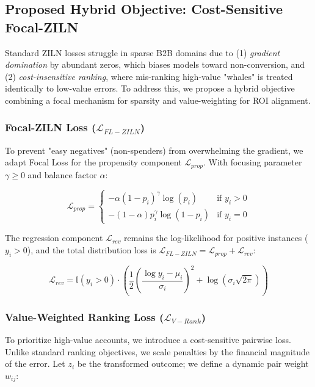 \documentclass[runningheads]{llncs}
\begin{document}
\subsection{Proposed Hybrid Objective: Cost-Sensitive Focal-ZILN}
Standard ZILN losses \cite{rerum2024}\cite{wang2019deep} struggle in sparse B2B domains due to (1) \textit{gradient domination} by abundant zeros, which biases models toward non-conversion, and (2) \textit{cost-insensitive ranking}, where mis-ranking high-value "whales" is treated identically to low-value errors. To address this, we propose a hybrid objective combining a focal mechanism for sparsity and value-weighting for ROI alignment.

\subsubsection{Focal-ZILN Loss ($\mathcal{L}_{FL-ZILN}$)}
To prevent "easy negatives" (non-spenders) from overwhelming the gradient, we adapt Focal Loss for the propensity component $\mathcal{L}_{prop}$. With focusing parameter $\gamma \ge 0$ and balance factor $\alpha$:

\begin{equation}
    \mathcal{L}_{prop} = \begin{cases} 
    -\alpha (1-p_i)^\gamma \log(p_i) & \text{if } y_i > 0 \\
    -(1-\alpha) p_i^\gamma \log(1-p_i) & \text{if } y_i = 0 
    \end{cases}
\end{equation}

The regression component $\mathcal{L}_{rev}$ remains the log-likelihood for positive instances ($y_i > 0$), and the total distribution loss is $\mathcal{L}_{FL-ZILN} = \mathcal{L}_{prop} + \mathcal{L}_{rev}$:

\begin{equation}
    \mathcal{L}_{rev} = \mathbb{I}(y_i > 0) \cdot \left( \frac{1}{2} \left( \frac{\log y_i - \mu_i}{\sigma_i} \right)^2 + \log(\sigma_i \sqrt{2\pi}) \right)
\end{equation}

\subsubsection{Value-Weighted Ranking Loss ($\mathcal{L}_{V-Rank}$)}
To prioritize high-value accounts, we introduce a cost-sensitive pairwise loss. Unlike standard ranking objectives, we scale penalties by the financial magnitude of the error. Let $z_i$ be the transformed outcome; we define a dynamic pair weight $w_{ij}$:
\end{document}
